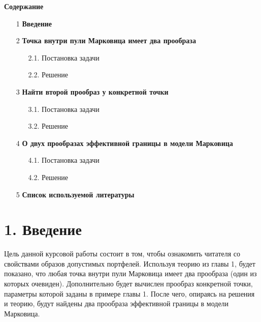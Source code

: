 \documentclass[12pt,a4 paper]{book}
\begin{document}
\smallskip
\begin{center}
{\bf\Large Содержание}
\end{center}
\begin{enumerate}
\item[1] \textbf{Введение} 

\item[2] \textbf{Точка внутри пули Марковица имеет два прообраза}
\begin{enumerate}
\item[2.1.] Постановка задачи
\item[2.2.] Решение
\end{enumerate}
\item[3] \textbf{Найти второй прообраз у конкретной точки}
\begin{enumerate}
\item[3.1.] Постановка задачи
\item[3.2.] Решение
\end{enumerate}
\item[4] \textbf{О двух прообразах эффективной границы в модели Марковица}
\begin{enumerate}
\item[4.1.] Постановка задачи
\item[4.2.] Решение
\end{enumerate}
\item[5] \textbf{Список используемой литературы}
\end{enumerate}

\newpage
\section*{1. Введение}
\smallskip
Цель данной курсовой работы состоит в том, чтобы ознакомить читателя со свойствами образов допустимых портфелей. Используя теорию из главы 1, будет показано, что любая точка внутри пули Марковица имеет два прообраза (один из которых очевиден). Дополнительно будет вычислен прообраз конкретной точки, параметры которой заданы в примере главы 1. После чего, опираясь на решения и теорию, будут найдены два прообраза эффективной границы в модели Марковица.

\newpage
\end{document}

